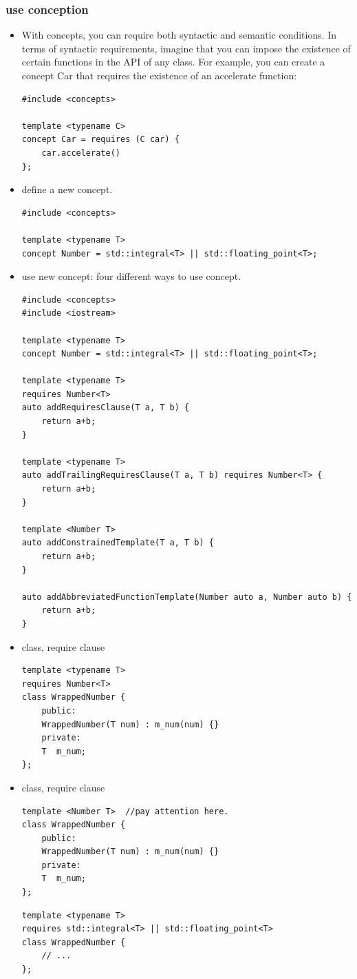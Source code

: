 \documentclass[a4paper,11pt,twoside]{book}
\begin{document}
\subsubsection{use conception}
\begin{itemize}
	\item With concepts, you can require both syntactic and semantic conditions. In terms of syntactic requirements, imagine that you can impose the existence of certain functions in the API of any class. For example, you can create a concept Car that requires the existence of an accelerate function:
\begin{lstlisting}
#include <concepts>

template <typename C>
concept Car = requires (C car) {
	car.accelerate()
};
\end{lstlisting}	

\item define a new concept.
\begin{lstlisting}
#include <concepts>

template <typename T>
concept Number = std::integral<T> || std::floating_point<T>;
\end{lstlisting}

\item use new concept: four different ways to use concept.
\begin{lstlisting}
#include <concepts>
#include <iostream>

template <typename T>
concept Number = std::integral<T> || std::floating_point<T>;

template <typename T>
requires Number<T>
auto addRequiresClause(T a, T b) {
	return a+b;
}

template <typename T>
auto addTrailingRequiresClause(T a, T b) requires Number<T> {
	return a+b;
}

template <Number T>
auto addConstrainedTemplate(T a, T b) {
	return a+b;
}

auto addAbbreviatedFunctionTemplate(Number auto a, Number auto b) {
	return a+b;
}

\end{lstlisting}


\item class, require clause
\begin{lstlisting}
template <typename T>
requires Number<T>
class WrappedNumber {
	public:
	WrappedNumber(T num) : m_num(num) {}
	private:
	T  m_num;
};
\end{lstlisting}

\item class, require clause
\begin{lstlisting}
template <Number T>  //pay attention here.
class WrappedNumber {
	public:
	WrappedNumber(T num) : m_num(num) {}
	private:
	T  m_num;
};
\end{lstlisting}

\begin{lstlisting}
template <typename T>
requires std::integral<T> || std::floating_point<T>
class WrappedNumber {
	// ...
};
\end{lstlisting}


\end{itemize}
\end{document}
